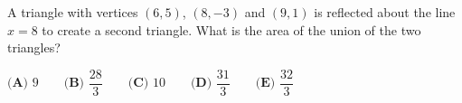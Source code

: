 A triangle with vertices $(6,5)$, $(8,-3)$ and $(9,1)$ is reflected about the line $x=8$ to create a second triangle. What is the area of the union of the two triangles?

$\textbf{(A) }9\qquad\textbf{(B) }\dfrac{28}{3}\qquad\textbf{(C) }10\qquad\textbf{(D) }\dfrac{31}{3}\qquad\textbf{(E) }\dfrac{32}{3}$
